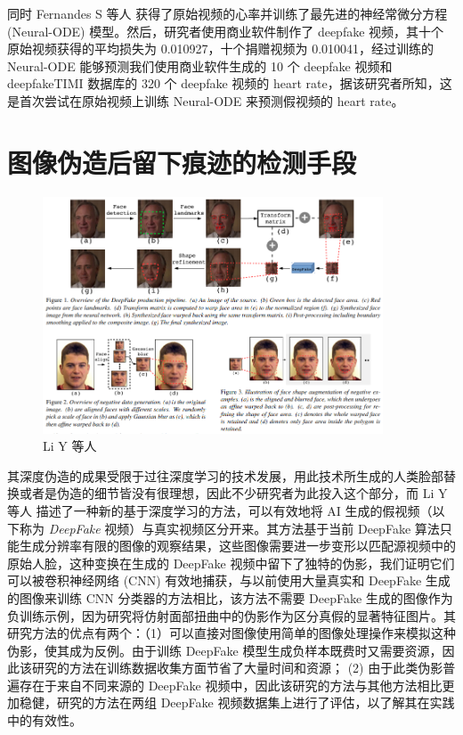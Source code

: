 同时 Fernandes S 等人 \cite{fernandes2019predicting} 获得了原始视频的心率并训练了最先进的神经常微分方程 (Neural-ODE) 模型。然后，研究者使用商业软件制作了 deepfake 视频，其十个原始视频获得的平均损失为 0.010927，十个捐赠视频为 0.010041，经过训练的 Neural-ODE 能够预测我们使用商业软件生成的 10 个 deepfake 视频和 deepfakeTIMI 数据库的 320 个 deepfake 视频的 heart rate，据该研究者所知，这是首次尝试在原始视频上训练 Neural-ODE 来预测假视频的 heart rate。


\section{图像伪造后留下痕迹的检测手段}

\begin{figure}[htb]
\centering 
\includegraphics[width=0.90\textwidth]{img/ch3m8.png} 
\caption{ Li Y 等人 \cite{li2018exposing} }
\label{Test}
\end{figure}

其深度伪造的成果受限于过往深度学习的技术发展，用此技术所生成的人类脸部替换或者是伪造的细节皆没有很理想，因此不少研究者为此投入这个部分，而 Li Y 等人 \cite{li2018exposing} 描述了一种新的基于深度学习的方法，可以有效地将 AI 生成的假视频（以下称为 {\em DeepFake} 视频）与真实视频区分开来。其方法基于当前 DeepFake 算法只能生成分辨率有限的图像的观察结果，这些图像需要进一步变形以匹配源视频中的原始人脸，这种变换在生成的 DeepFake 视频中留下了独特的伪影，我们证明它们可以被卷积神经网络 (CNN) 有效地捕获，与以前使用大量真实和 DeepFake 生成的图像来训练 CNN 分类器的方法相比，该方法不需要 DeepFake 生成的图像作为负训练示例，因为研究将仿射面部扭曲中的伪影作为区分真假的显著特征图片。其研究方法的优点有两个：（1）可以直接对图像使用简单的图像处理操作来模拟这种伪影，使其成为反例。由于训练 DeepFake 模型生成负样本既费时又需要资源，因此该研究的方法在训练数据收集方面节省了大量时间和资源； (2) 由于此类伪影普遍存在于来自不同来源的 DeepFake 视频中，因此该研究的方法与其他方法相比更加稳健，研究的方法在两组 DeepFake 视频数据集上进行了评估，以了解其在实践中的有效性。

